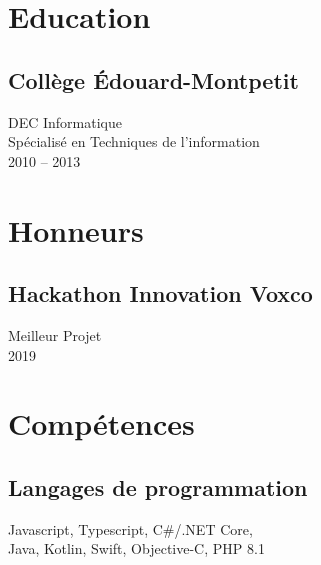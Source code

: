\documentclass{article}
\begin{document}
\setlength{\columnsep}{4em}
\setlength{\columnseprule}{0.4pt}
\begin{paracol}{2}
  \begin{leftcolumn}
    \vspace{-2.5em}
    \section{Education}

    \subsection{Collège Édouard-Montpetit}
    DEC Informatique \\
    Spécialisé en Techniques de l'information \\
    2010 -- 2013

    \section{Honneurs}

    \subsection{Hackathon Innovation Voxco}
    Meilleur Projet \\
    2019

    \section{Compétences}

    \subsection{Langages de programmation}
    Javascript, Typescript, C\#/.NET Core,\\
    Java, Kotlin, Swift, Objective-C, PHP 8.1

    \vspace{0.5em}


\end{leftcolumn}
\end{paracol}
\end{document}
